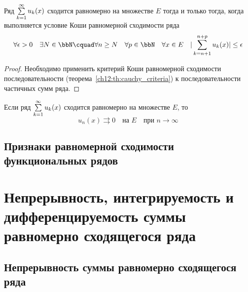 \begin{thm}
	\label{ch12:th:cauchy_criteria_series}
	Ряд $\sum_{k=1}^{\infty}\limits u_k(x)$ сходится равномерно на множестве $E$ тогда
	и только тогда, когда выполняется условие Коши равномерной сходимости ряда
	\begin{equation}
		\label{ch12:p1:eq:cauchy_cond_series}
		\forall \epsilon > 0 \quad \exists N \in \bbN \cquad
			\forall n \ge N \quad \forall p \in \bbN \quad \forall x \in E \quad
			|\sum_{k=n+1}^{n+p} u_k(x)| \le \epsilon
	\end{equation}
\end{thm}
\begin{proof}
	Необходимо применить критерий Коши равномерной сходимости последовательности
	(теорема~\ref{ch12:th:cauchy_criteria}) к последовательности частичных сумм ряда.
\end{proof}
\begin{cons}
	Если ряд $\sum_{k=1}^{\infty}\limits u_k(x)$ сходится равномерно на множестве $E$,
	то
	$$
		u_n(x) \rightrightarrows 0 \quad \text{на } E \quad \text{при } n \to \infty
	$$
\end{cons}


\subsection{Признаки равномерной сходимости функциональных рядов}



\section{Непрерывность, интегрируемость и дифференцируемость суммы равномерно сходящегося ряда}

\subsection{Непрерывность суммы равномерно сходящегося ряда}

